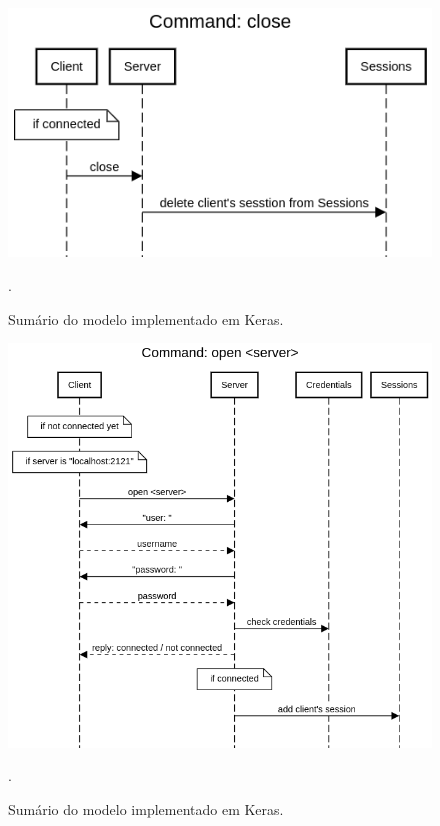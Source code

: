 \documentclass[conference]{IEEEtran}
\begin{document}
\begin{figure}[htbp]
\centering
\centerline{\includegraphics[scale=0.4]{diagrams/Command_close.png}}
\caption{Sumário do modelo implementado em Keras.}.
\label{summary}
\end{figure}

\begin{figure}[htbp]
\centering
\centerline{\includegraphics[scale=0.4]{diagrams/Command_open_server.png}}
\caption{Sumário do modelo implementado em Keras.}.
\label{summary}
\end{figure}
\end{document}
